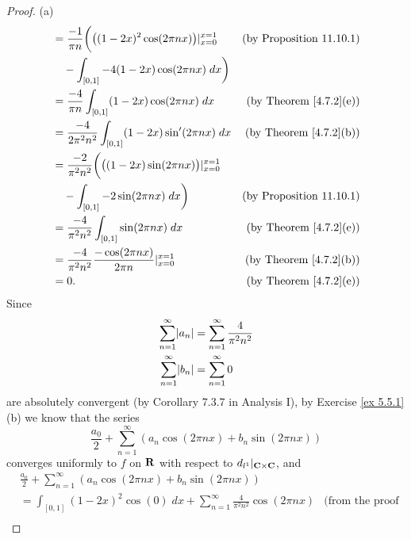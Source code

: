 \begin{proof}{(a)}
\begin{align*}
            & = \frac{-1}{\pi n} \bigg(\big((1 - 2x)^2 \cos(2 \pi n x)\big)|_{x = 0}^{x = 1}   & \text{(by Proposition 11.10.1)}     \\
            & \quad - \int_{[0, 1]} -4 (1 - 2x) \cos(2 \pi n x) \; dx\bigg)                                                          \\
            & = \frac{-4}{\pi n} \int_{[0, 1]} (1 - 2x) \cos(2 \pi n x) \; dx                  & \text{(by Theorem \ref{4.7.2}(e))}  \\
            & = \frac{-4}{2 \pi^2 n^2} \int_{[0, 1]} (1 - 2x) \sin'(2 \pi n x) \; dx           & \text{(by Theorem \ref{4.7.2}(b))}  \\
            & = \frac{-2}{\pi^2 n^2} \bigg(\big((1 - 2x) \sin(2 \pi n x)\big)|_{x = 0}^{x = 1}                                       \\
            & \quad - \int_{[0, 1]} -2 \sin(2 \pi n x) \; dx\bigg)                             & \text{(by Proposition 11.10.1)}     \\
            & = \frac{-4}{\pi^2 n^2} \int_{[0, 1]} \sin(2 \pi n x) \; dx                       & \text{(by Theorem \ref{4.7.2}(e))}  \\
            & = \frac{-4}{\pi^2 n^2} \frac{-\cos(2 \pi n x)}{2 \pi n}|_{x = 0}^{x = 1}         & \text{(by Theorem \ref{4.7.2}(b))}  \\
            & = 0.                                                                             & \text{(by Theorem \ref{4.7.2}(e))}
    \end{align*}
    Since
    \begin{align*}
        \sum_{n = 1}^\infty \abs{a_n} & = \sum_{n = 1}^\infty \frac{4}{\pi^2 n^2} \\
        \sum_{n = 1}^\infty \abs{b_n} & = \sum_{n = 1}^\infty 0
    \end{align*}
    are absolutely convergent (by Corollary 7.3.7 in Analysis I), by Exercise \ref{ex 5.5.1}(b) we know that the series
    \[
        \frac{a_0}{2} + \sum_{n = 1}^\infty (a_n \cos(2 \pi n x) + b_n \sin(2 \pi n x))
    \]
    converges uniformly to \(f\) on \(\mathbf{R}\) with respect to \(d_{l^1}|_{\mathbf{C} \times \mathbf{C}}\), and
    \begin{align*}
         & \frac{a_0}{2} + \sum_{n = 1}^\infty (a_n \cos(2 \pi n x) + b_n \sin(2 \pi n x))                                                                                                  \\
         & = \int_{[0, 1]} (1 - 2x)^2 \cos(0) \; dx + \sum_{n = 1}^\infty \frac{4}{\pi^2 n^2} \cos(2 \pi n x)                                          & \text{(from the proof above)}      \\

\end{align*}
\end{proof}
